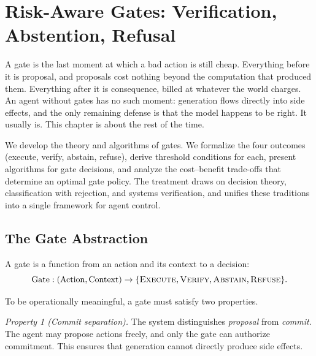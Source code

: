 \documentclass[11pt]{book}
\begin{document}


\chapter{Risk-Aware Gates: Verification, Abstention, Refusal}
\label{ch:gates}

A gate is the last moment at which a bad action is still cheap. Everything before it is proposal, and proposals cost nothing beyond the computation that produced them. Everything after it is consequence, billed at whatever the world charges. An agent without gates has no such moment: generation flows directly into side effects, and the only remaining defense is that the model happens to be right. It usually is. This chapter is about the rest of the time.

We develop the theory and algorithms of gates. We formalize the four outcomes (execute, verify, abstain, refuse), derive threshold conditions for each, present algorithms for gate decisions, and analyze the cost--benefit trade-offs that determine an optimal gate policy. The treatment draws on decision theory, classification with rejection, and systems verification, and unifies these traditions into a single framework for agent control.

\section{The Gate Abstraction}

A gate is a function from an action and its context to a decision:
\[
\text{Gate}: (\text{Action}, \text{Context}) \rightarrow \{\textsc{Execute}, \textsc{Verify}, \textsc{Abstain}, \textsc{Refuse}\}.
\]

To be operationally meaningful, a gate must satisfy two properties.

\textit{Property 1 (Commit separation).} The system distinguishes \textit{proposal} from \textit{commit}. The agent may propose actions freely, and only the gate can authorize commitment. This ensures that generation cannot directly produce side effects.
\end{document}
